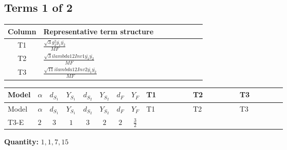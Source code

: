 \documentclass[8pt]{article}
\begin{document}
\begin{landscape}
\subsection*{Terms 1 of 2}
\begin{center}
\begin{tabular}{@{}c >{\raggedright\arraybackslash}p{0.82\linewidth}@{}}
\toprule
Column & Representative term structure \\
\midrule
T1 & \(\displaystyle \frac{\sqrt{3} g_{2}^{2} \overline{y_{1}} \overline{y_{2}}}{MF}\) \\
\midrule
T2 & \(\displaystyle \frac{\sqrt{3} i lambda12Inv1 \overline{y_{1}} \overline{y_{2}}}{MF}\) \\
\midrule
T3 & \(\displaystyle \frac{\sqrt{11} i lambda12Inv2 \overline{y_{1}} \overline{y_{2}}}{MF}\) \\
\midrule
\bottomrule
\end{tabular}
\end{center}
\smallskip
\tiny
\begin{longtable}{@{}llcccccc >{\raggedright\arraybackslash}p{0.21\linewidth} >{\raggedright\arraybackslash}p{0.21\linewidth} >{\raggedright\arraybackslash}p{0.21\linewidth}@{}}
\toprule
Model & $\alpha$ & $d_{S_1}$ & $Y_{S_1}$ & $d_{S_2}$ & $Y_{S_2}$ & $d_F$ & $Y_F$ & T1 & T2 & T3 \\
\midrule
\endfirsthead
\toprule
Model & $\alpha$ & $d_{S_1}$ & $Y_{S_1}$ & $d_{S_2}$ & $Y_{S_2}$ & $d_F$ & $Y_F$ & T1 & T2 & T3 \\
\midrule
\endhead
T3-E & $2$ & $3$ & $1$ & $3$ & $2$ & $2$ & $\frac{3}{2}$ & \scriptsize\adjustbox{max width=\linewidth}{$\begin{gathered} \frac{\sqrt{3} g_{2}^{2} \overline{y_{1}} \overline{y_{2}}}{6 MF}\end{gathered}$} & \scriptsize\adjustbox{max width=\linewidth}{$\begin{gathered} - \frac{\sqrt{3} i lambda12Inv1 \overline{y_{1}} \overline{y_{2}}}{6 MF}\end{gathered}$} & \scriptsize\adjustbox{max width=\linewidth}{$\begin{gathered} \frac{3 \sqrt{11} i lambda12Inv2 \overline{y_{1}} \overline{y_{2}}}{22 MF}\end{gathered}$} \\
\midrule
\bottomrule
\end{longtable}
\clearpage
\noindent\textbf{Quantity: }$\mathrm{1,1,7,15}$\par\smallskip

\end{landscape}
\end{document}
